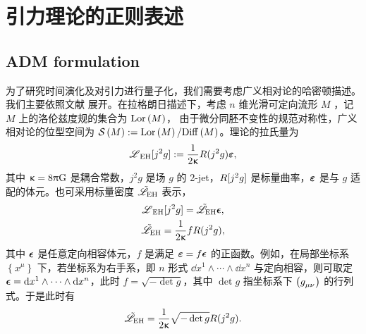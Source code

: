 
\chapter{引力理论的正则表述}

	\label{chp-canonical_gravity}
	\section{ADM formulation}
	
		\label{sec_adm}
		为了研究时间演化及对引力进行量子化，我们需要考虑广义相对论的哈密顿描述。我们主要依照文献  展开。在拉格朗日描述下，考虑 $n$ 维光滑可定向流形 $M$ ，记$M$ 上的洛伦兹度规的集合为 $\mathrm{Lor}\left(M\right)$， 由于微分同胚不变性的规范对称性，广义相对论的位型空间为 $\mathcal{S}\left(M\right) := \mathrm{Lor}\left(M\right)/\mathrm{Diff}\left(M\right)$。理论的拉氏量为
		\begin{equation}
			\bm{\mathscr{L}}_{\text{EH}}[j^2 g] := \frac{1}{2\upkappa} {R}(j^2 g) \bm{\varepsilon},
		\end{equation}
		其中 $\gkappa = 8\uppi \nG$ 是耦合常数，$j^2 g$ 是场 $g$ 的 2-jet，${R}[j^2 g]$ 是标量曲率，$\bm{\varepsilon}$ 是与 $g$ 适配的体元。也可采用标量密度 $\tilde{\mathscr{L}}_{\text{EH}}$ 表示，
		\begin{gather}
			\bm{\mathscr{L}}_{\text{EH}}[j^2 g] = \tilde{\mathscr{L}}_{\text{EH}} \bm{\epsilon},\\
			\tilde{\mathscr{L}}_{\text{EH}} = \frac{1}{2\upkappa} f {R}(j^2 g),
		\end{gather}
		其中 $\bm{\epsilon}$ 是任意定向相容体元，$f$ 是满足 $\bm{\varepsilon} = f \bm{\epsilon}$ 的正函数。例如，在局部坐标系 $\left\{ x^\mu \right\}$ 下，若坐标系为右手系，即 $n$ 形式 $\dd{x^1} \wedge \cdots \wedge \dd{x^n}$ 与定向相容，则可取定 $\bm{\epsilon} = \dd{x^1} \wedge \cdots \wedge \dd{x^n}$，此时 $f=\sqrt{-\det g}$，其中 $\det g$ 指坐标系下 $\left( \tensor{g}{_\mu_\nu} \right)$ 的行列式。于是此时有
		\begin{equation}
			\tilde{\mathscr{L}}_{\text{EH}} = \frac{1}{2\upkappa} \sqrt{-\det g} {R}(j^2 g).
		\end{equation}

		\nomenclature{$\gkappa$}{$\gkappa=8\uppi \nG$}

